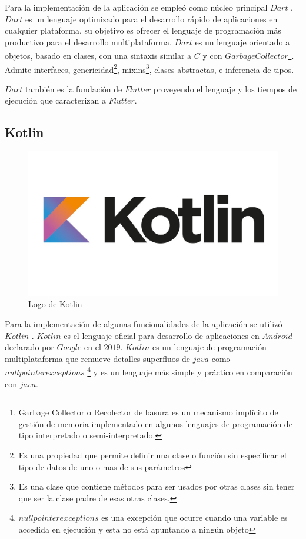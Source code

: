 Para la implementación de la aplicación se empleó como núcleo principal $Dart$ . $Dart$ es un lenguaje optimizado para el desarrollo rápido de aplicaciones en cualquier plataforma, su objetivo es ofrecer el lenguaje de programación más productivo para el desarrollo multiplataforma. $Dart$ es un lenguaje orientado a objetos, basado en clases, con una sintaxis similar a $C$ y con $Garbage Collector$\footnote{Garbage Collector o Recolector de basura es un mecanismo implícito de gestión de memoria implementado en algunos lenguajes de programación de tipo interpretado o semi-interpretado.}. Admite interfaces, genericidad\footnote{Es una propiedad que permite definir una clase o función sin especificar el tipo de datos de uno o mas de sus parámetros }, mixins\footnote{Es una clase que contiene métodos para ser usados por otras clases sin tener que ser la clase padre de esas otras clases. }, clases abstractas,  e inferencia de tipos. 

$Dart$ también es la fundación de $Flutter$ proveyendo el lenguaje y los tiempos de ejecución que caracterizan a $Flutter$.



\subsection{Kotlin}

\begin{figure}[h!]
\begin{center}
\includegraphics[scale=0.11]{Graphics/images/LogoKotlin.jpg}
\caption{Logo de Kotlin}
\label{fig:rcm}

\end{center}
\end{figure}

Para la implementación de algunas funcionalidades de la aplicación se utilizó $Kotlin$ . $Kotlin$ es el lenguaje oficial para desarrollo de aplicaciones en $Android$ declarado por $Google$ en el $2019$. $Kotlin$ es un lenguaje de programación multiplataforma que remueve detalles superfluos de $java$ como $null pointer exceptions$ \footnote{$null pointer exceptions$ es una excepción que ocurre cuando una variable es accedida en ejecución y esta no está apuntando a ningún objeto} y es un lenguaje más simple y práctico en comparación con $java$.




